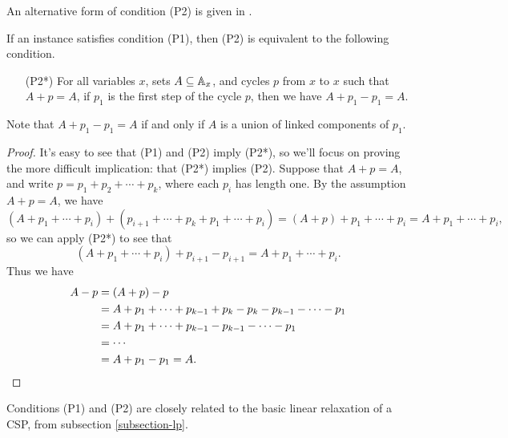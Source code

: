 \documentclass[letterpaper,11pt]{article}
\begin{document}
An alternative form of condition (P2) is given in \cite{sdp}.

\begin{prop}\label{prop-p2*} If an instance satisfies condition (P1), then (P2) is equivalent to the following condition.
\begin{itemize}
\item[(P2*)] For all variables $x$, sets $A \subseteq \mathbb{A}_x$, and cycles $p$ from $x$ to $x$ such that $A + p = A$, if $p_1$ is the first step of the cycle $p$, then we have $A + p_1 - p_1 = A$.
\end{itemize}
Note that $A + p_1 - p_1 = A$ if and only if $A$ is a union of linked components of $p_1$.
\end{prop}
\begin{proof} It's easy to see that (P1) and (P2) imply (P2*), so we'll focus on proving the more difficult implication: that (P2*) implies (P2). Suppose that $A + p = A$, and write $p = p_1 + p_2 + \cdots + p_k$, where each $p_i$ has length one. By the assumption $A + p = A$, we have
\[
(A + p_1 + \cdots + p_i) + (p_{i+1} + \cdots + p_k + p_1 + \cdots + p_i) = (A + p) + p_1 + \cdots + p_i = A + p_1 + \cdots + p_i,
\]
so we can apply (P2*) to see that
\[
(A + p_1 + \cdots + p_i) + p_{i+1} - p_{i+1} = A + p_1 + \cdots + p_i.
\]
Thus we have
\begin{align*}
A - p &= (A + p) - p\\
&= A + p_1 + \cdots + p_{k-1} + p_k - p_k - p_{k-1} - \cdots - p_1\\
&= A + p_1 + \cdots + p_{k-1} - p_{k-1} - \cdots - p_1\\
&= \cdots\\
&= A + p_1 - p_1 = A.\qedhere
\end{align*}
\end{proof}

Conditions (P1) and (P2) are closely related to the basic linear relaxation of a CSP, from subsection \ref{subsection-lp}.
\end{document}

